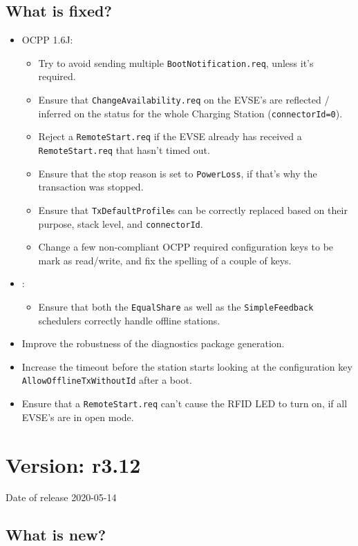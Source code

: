 \documentclass{scrartcl}
\begin{document}
\subsection*{What is fixed?}
\begin{itemize}
\item OCPP 1.6J:
  \begin{itemize}
  \item Try to avoid sending multiple \verb|BootNotification.req|, unless it's
    required.
  \item Ensure that \verb|ChangeAvailability.req| on the EVSE's are reflected
    / inferred on the status for the whole Charging Station
    (\verb|connectorId=0|).
  \item Reject a \verb|RemoteStart.req| if the EVSE already has received a
    \verb|RemoteStart.req| that hasn't timed out.
  \item Ensure that the stop reason is set to \verb|PowerLoss|, if that's why
    the transaction was stopped.
  \item Ensure that \verb|TxDefaultProfile|s can be correctly replaced based
    on their purpose, stack level, and \verb|connectorId|.
  \item Change a few non-compliant OCPP required configuration keys to be mark
    as read/write, and fix the spelling of a couple of keys.
  \end{itemize}
\item \nanogrid:
  \begin{itemize}
  \item Ensure that both the \verb|EqualShare| as well as the
    \verb|SimpleFeedback| schedulers correctly handle offline stations.
  \end{itemize}
\item Improve the robustness of the diagnostics package generation.
\item Increase the timeout before the station starts looking at the
  configuration key \verb|AllowOfflineTxWithoutId| after a boot.
\item Ensure that a \verb|RemoteStart.req| can't cause the RFID LED to turn
  on, if all EVSE's are in open mode.
\end{itemize}

\section{Version: r3.12}
Date of release 2020-05-14

\subsection*{What is new?}
\end{document}
